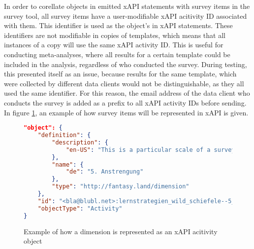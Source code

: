     In order to corellate objects in emitted xAPI statements with survey
    items in the survey tool, all survey items have a user-modifiable
    xAPI acitivity ID associated with them. This identifier is
    used as the object's  in xAPI statements.
    These identifiers are not modifiable in copies of templates,
    which means that all instances of a copy will use the same xAPI
    activity ID. This is useful for conducting meta-analyses, where
    all results for a certain template could be included in the analysis,
    regardless of who conducted the survey. During testing, this
    presented itself as an issue, because results for the same template,
    which were collected by different data clients would not be distinguishable,
    as they all used the same identifier. For this reason,
    the email address of the data client who conducts the survey
    is added as a prefix to all xAPI activity IDs before sending.
    In figure \ref{fig:example-xapi-activity-dimension}, an example
    of how survey items will be represented in xAPI is given. 

    \begin{figure}
        \begin{lstlisting}[language=JSON]
"object": {
    "definition": {
        "description": {
            "en-US": "This is a particular scale of a survey, it usually contains multiple questions."
        },
        "name": {
            "de": "5. Anstrengung"
        },
        "type": "http://fantasy.land/dimension"
    },
    "id": "<bla@blubl.net>:lernstrategien_wild_schiefele--5_anstrengung",
    "objectType": "Activity"
}
        \end{lstlisting}
        \caption{Example of how a dimension is represented as an xAPI acitivity object}
        \label{fig:example-xapi-activity-dimension}
    \end{figure}

